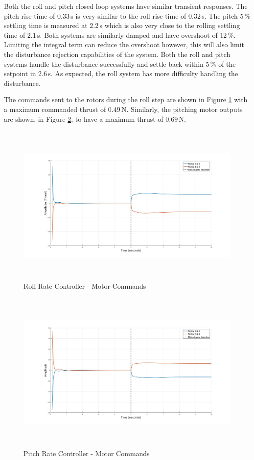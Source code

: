 		Both the roll and pitch closed loop systems have similar transient responses. The pitch rise time of $0.33$\,s is very similar to the roll rise time of $0.32$\,s. The pitch $5$\,\% settling time is measured at $2.2$\,s which is also very close to the rolling settling time of $2.1$\,s. Both systems are similarly damped and have overshoot of $12$\,\%. Limiting the integral term can reduce the overshoot however, this will also limit the disturbance rejection capabilities of the system. Both the roll and pitch systems handle the disturbance successfully and settle back within $5$\,\% of the setpoint in $2.6$\,s. As expected, the roll system has more difficulty handling the disturbance.

		The commands sent to the rotors during the roll step are shown in Figure \ref{IM_RollRateImpulse} with a maximum commanded thrust of $0.49$\,N. Similarly, the pitching motor outputs are shown, in Figure \ref{IM_PitchRateImpulse}, to have a maximum thrust of $0.69$\,N.
		
		\begin{figure}[H]
			\centering
			\includegraphics[height = 8cm]{../Design/Matlab/Controllers/roll_rate_impulse.jpg}
			\caption{Roll Rate Controller -  Motor Commands}
			\label{IM_RollRateImpulse}
		\end{figure}
		
		\begin{figure}[H]
			\centering
			\includegraphics[height = 8cm]{../Design/Matlab/Controllers/pitch_rate_impulse.jpg}
			\caption{Pitch Rate Controller -  Motor Commands}
			\label{IM_PitchRateImpulse}
		\end{figure}
		
